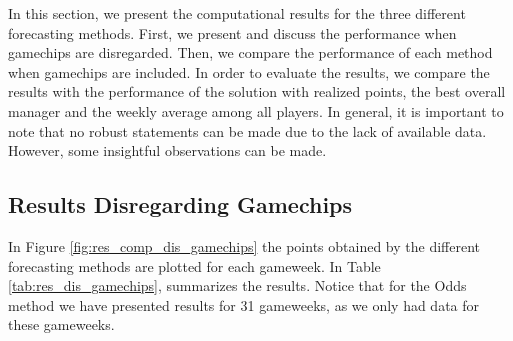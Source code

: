 In this section, we present the computational results for the three different forecasting methods. First, we present and discuss the performance when gamechips are disregarded. Then, we compare the performance of each method when gamechips are included. In order to evaluate the results, we compare the results with the performance of the solution with realized points, the best overall manager and the weekly average among all players. In general, it is important to note that no robust statements can be made due to the lack of available data. However, some insightful observations can be made.

\newpage

\subsection{Results Disregarding Gamechips}

In Figure \ref{fig:res_comp_dis_gamechips} the points obtained by the different forecasting methods are plotted for each gameweek. In Table \ref{tab:res_dis_gamechips}, summarizes the results. Notice that for the Odds method we have presented results for 31 gameweeks, as we only had data for these gameweeks.

